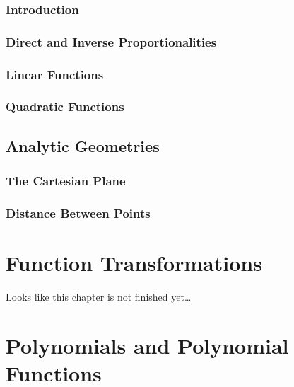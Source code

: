 \documentclass[
]{book}
\theoremstyle{definition}
\theoremstyle{definition}
\theoremstyle{definition}
\theoremstyle{definition}
\theoremstyle{remark}
\begin{document}
\hypertarget{introduction}{%
\subsection{Introduction}\label{introduction}}

\hypertarget{direct-and-inverse-proportionalities}{%
\subsection{Direct and Inverse Proportionalities}\label{direct-and-inverse-proportionalities}}

\hypertarget{linear-functions}{%
\subsection{Linear Functions}\label{linear-functions}}

\hypertarget{quadratic-functions}{%
\subsection{Quadratic Functions}\label{quadratic-functions}}

\hypertarget{analytic-geometries}{%
\section{Analytic Geometries}\label{analytic-geometries}}

\hypertarget{the-cartesian-plane}{%
\subsection{The Cartesian Plane}\label{the-cartesian-plane}}

\hypertarget{distance-between-points}{%
\subsection{Distance Between Points}\label{distance-between-points}}

\hypertarget{function-transformations}{%
\chapter{Function Transformations}\label{function-transformations}}

Looks like this chapter is not finished yet\ldots{}

\hypertarget{polynomials-and-polynomial-functions}{%
\chapter{Polynomials and Polynomial Functions}\label{polynomials-and-polynomial-functions}}
\end{document}
